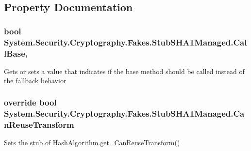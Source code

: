 \subsection{Property Documentation}
\hypertarget{class_system_1_1_security_1_1_cryptography_1_1_fakes_1_1_stub_s_h_a1_managed_a1d8f2c94455d82393ec987c6f1910cdd}{
\subsubsection[{Call\-Base}]{\setlength{\rightskip}{0pt plus 5cm}bool System.\-Security.\-Cryptography.\-Fakes.\-Stub\-S\-H\-A1\-Managed.\-Call\-Base\hspace{0.3cm}{\ttfamily [get]}, {\ttfamily [set]}}}\label{class_system_1_1_security_1_1_cryptography_1_1_fakes_1_1_stub_s_h_a1_managed_a1d8f2c94455d82393ec987c6f1910cdd}


Gets or sets a value that indicates if the base method should be called instead of the fallback behavior

\hypertarget{class_system_1_1_security_1_1_cryptography_1_1_fakes_1_1_stub_s_h_a1_managed_a332f4a06797ab36de7bfd9f4e16c3ed0}{
\subsubsection[{Can\-Reuse\-Transform}]{\setlength{\rightskip}{0pt plus 5cm}override bool System.\-Security.\-Cryptography.\-Fakes.\-Stub\-S\-H\-A1\-Managed.\-Can\-Reuse\-Transform\hspace{0.3cm}{\ttfamily [get]}}}\label{class_system_1_1_security_1_1_cryptography_1_1_fakes_1_1_stub_s_h_a1_managed_a332f4a06797ab36de7bfd9f4e16c3ed0}


Sets the stub of Hash\-Algorithm.\-get\-\_\-\-Can\-Reuse\-Transform()

